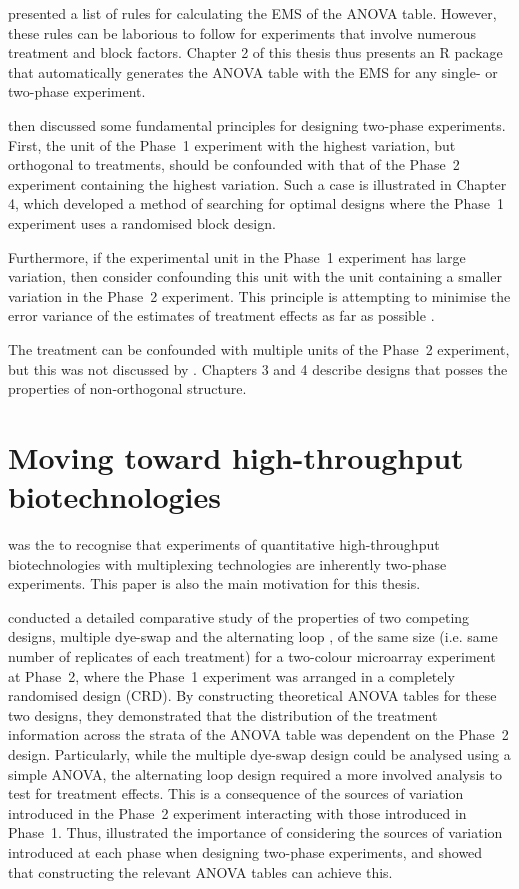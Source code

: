 \documentclass[11pt,a4paper]{article}
\begin{document}
\cite{Brien2011} presented a list of rules for calculating the EMS of the ANOVA table. However, these rules can be laborious to follow for experiments that involve numerous treatment and block factors. Chapter 2 of this thesis thus presents an R package that automatically generates the ANOVA table with the EMS for any single- or two-phase experiment. 

\cite{Brien2011} then discussed some fundamental principles for designing two-phase experiments. First, the unit of the Phase~1 experiment with the highest variation, but orthogonal to treatments, should be confounded with that of the Phase~2 experiment containing the highest variation. Such a case is illustrated in Chapter 4, which developed a method of searching for optimal designs where the Phase~1 experiment uses a randomised block design. 

Furthermore, if the experimental unit in the Phase~1 experiment has large variation, then consider confounding this unit with the unit containing a smaller variation in the Phase~2 experiment. This principle is attempting to minimise the error variance of the estimates of treatment effects as far as possible \citep{Brien2011}. 

The treatment can be confounded with multiple units of the Phase~2 experiment, but this was not discussed by \cite{Brien2011}. Chapters 3 and 4 describe designs that posses the properties of non-orthogonal structure. 

\section{Moving toward high-throughput biotechnologies}
\label{sec:Jarrett2008}
\cite{Jarrett2008} was the to recognise that experiments of quantitative high-throughput biotechnologies with multiplexing technologies are inherently two-phase experiments. This paper is also the main motivation for this thesis.

\cite{Jarrett2008} conducted a detailed comparative study of the properties of two competing designs, multiple dye-swap and the alternating loop \citep{Churchill2002}, of the same size (i.e. same number of replicates of each treatment) for a two-colour microarray experiment at Phase~2, where the Phase~1 experiment was arranged in a completely randomised design (CRD). By constructing theoretical ANOVA tables for these two designs, they demonstrated that the distribution of the treatment information across the strata of the ANOVA table was dependent on the Phase~2 design. Particularly, while the multiple dye-swap design could be analysed using a simple ANOVA, the alternating loop design required a more involved analysis to test for treatment effects. This is a consequence of the sources of variation introduced in the Phase~2 experiment interacting with those introduced in Phase~1. Thus, \cite{Jarrett2008} illustrated the importance of considering the sources of variation introduced at each phase when designing two-phase experiments, and showed that constructing the relevant ANOVA tables can achieve this.
 
\end{document}
